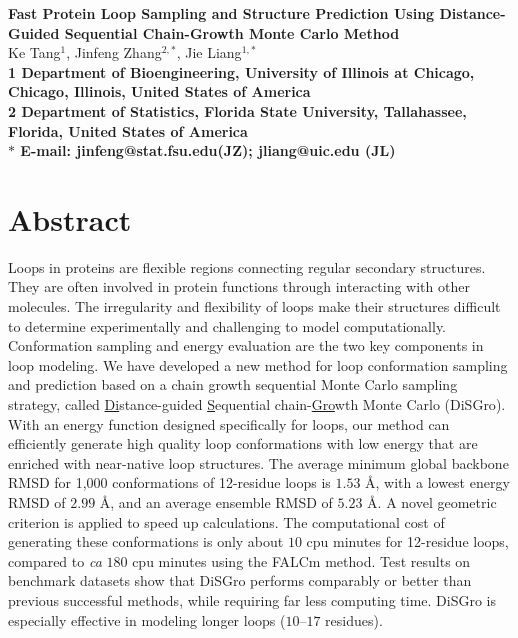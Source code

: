 

\begin{flushleft}
{\Large \textbf{Fast Protein Loop Sampling and Structure Prediction
Using Distance-Guided Sequential Chain-Growth Monte Carlo Method} }
\\
Ke Tang$^{1}$, Jinfeng Zhang$^{2,\ast}$, Jie Liang$^{1,\ast}$
\\
\bf{1} Department of Bioengineering, University of Illinois at
Chicago, Chicago, Illinois, United States of America
\\
\bf{2} Department of Statistics, Florida State University,
Tallahassee, Florida, United States of America
\\
$\ast$ E-mail: jinfeng@stat.fsu.edu(JZ); jliang@uic.edu (JL)
\end{flushleft}

\section*{Abstract}
Loops in proteins are flexible regions connecting regular secondary
structures. They are often involved in protein functions through
interacting with other molecules. The irregularity and flexibility
of loops make their structures difficult to determine experimentally
and challenging to model computationally. Conformation sampling and
energy evaluation are the two key components in loop modeling.  We
have developed a new method for loop conformation sampling and
prediction based on a chain growth sequential Monte Carlo sampling
strategy, called \underline{Di}stance-guided \underline{S}equential
chain-\underline{Gro}wth Monte Carlo ({\sc DiSGro}). With an energy
function designed specifically for loops, our method can efficiently
generate high quality loop conformations with low energy that are
enriched with near-native loop structures. The average minimum
global backbone RMSD for 1,000 conformations of 12-residue loops is
$1.53$ \r{A}, with a lowest energy RMSD of $2.99$ \r{A}, and an
average ensemble RMSD of $5.23$ \r{A}. A novel geometric criterion
is applied to speed up calculations. The computational cost of
generating these conformations is only about $10$ cpu minutes for
12-residue loops, compared to {\it ca} $180$ cpu minutes using the
FALCm method. Test results on benchmark datasets show that {\sc
DiSGro} performs comparably or better than previous successful
methods, while requiring far less computing time. {\sc DiSGro} is
especially effective in modeling longer loops ($10$--$17$ residues).

